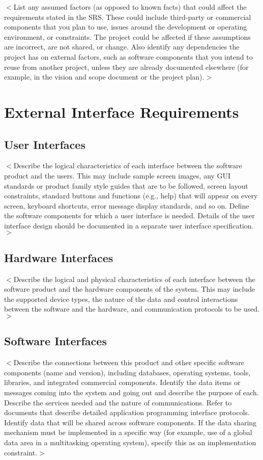 \documentclass{scrreprt}
\begin{document}
\begin{CJK}{UTF8}{bkai}
$<$List any assumed factors (as opposed to known facts) that could affect the 
requirements stated in the SRS. These could include third-party or commercial 
components that you plan to use, issues around the development or operating 
environment, or constraints. The project could be affected if these assumptions 
are incorrect, are not shared, or change. Also identify any dependencies the 
project has on external factors, such as software components that you intend to 
reuse from another project, unless they are already documented elsewhere (for 
example, in the vision and scope document or the project plan).$>$


\chapter{External Interface Requirements}

\section{User Interfaces}
$<$Describe the logical characteristics of each interface between the software 
product and the users. This may include sample screen images, any GUI standards 
or product family style guides that are to be followed, screen layout 
constraints, standard buttons and functions (e.g., help) that will appear on 
every screen, keyboard shortcuts, error message display standards, and so on.  
Define the software components for which a user interface is needed. Details of 
the user interface design should be documented in a separate user interface 
specification.$>$

\section{Hardware Interfaces}
$<$Describe the logical and physical characteristics of each interface between 
the software product and the hardware components of the system. This may include 
the supported device types, the nature of the data and control interactions 
between the software and the hardware, and communication protocols to be 
used.$>$

\section{Software Interfaces}
$<$Describe the connections between this product and other specific software 
components (name and version), including databases, operating systems, tools, 
libraries, and integrated commercial components. Identify the data items or 
messages coming into the system and going out and describe the purpose of each.  
Describe the services needed and the nature of communications. Refer to 
documents that describe detailed application programming interface protocols.  
Identify data that will be shared across software components. If the data 
sharing mechanism must be implemented in a specific way (for example, use of a 
global data area in a multitasking operating system), specify this as an 
implementation constraint.$>$


\end{CJK}
\end{document}
